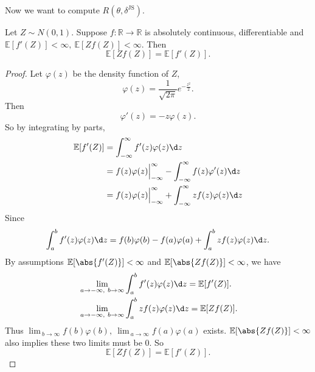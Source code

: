 \documentclass[a4paper]{article}
\begin{document}
\noindent Now we want to compute $R(\theta,\delta^{\text{JS}})$.

\begin{lemma}
	Let $Z \sim N(0,1)$. Suppose $f: \mathbb{R} \to \mathbb{R}$ is absolutely continuous, differentiable and $\mathbb{E}[f'(Z)] < \infty, \ \mathbb{E}[Zf(Z)] < \infty$. Then
	\begin{equation}
		\mathbb{E}[Zf(Z)] = \mathbb{E}[f'(Z)].
	\end{equation}
\end{lemma}

\begin{proof}
	Let $\varphi(z)$ be the density function of $Z$,
	\begin{equation*}
		\varphi(z) = \frac{1}{\sqrt{2\pi}}e^{-\frac{z^2}{2}}.
	\end{equation*}
	Then
	\begin{equation*}
		\varphi'(z) = -z\varphi(z).
	\end{equation*}
	So by integrating by parts,
	\begin{equation*}
		\begin{aligned}
			\mathbb{E}[f'(Z)] &= \int_{-\infty}^{\infty} f'(z)\varphi(z)\d z \\
			&= f(z)\varphi(z)\Big|_{-\infty}^{\infty} - \int_{-\infty}^{\infty} f(z) \varphi'(z)\d z \\
			&= f(z)\varphi(z)\Big|_{-\infty}^{\infty} + \int_{-\infty}^{\infty} zf(z) \varphi(z)\d z
		\end{aligned}
	\end{equation*}
	Since
	\begin{equation*}
		\int_{a}^{b} f'(z)\varphi(z)\d z = f(b)\varphi(b) - f(a)\varphi(a) + \int_{a}^{b} zf(z) \varphi(z)\d z.
	\end{equation*}
	By assumptions $\mathbb{E}[\abs{f'(Z)}] < \infty$ and $\mathbb{E}[\abs{Zf(Z)}] < \infty$, we have
	\begin{equation*}
		\begin{aligned}
			& \lim_{a \to -\infty, \ b \to \infty} \int_a^b f'(z)\varphi(z)\d z = \mathbb{E}[f'(Z)]. \\
			& \lim_{a \to -\infty, \ b \to \infty} \int_a^b zf(z)\varphi(z)\d z = \mathbb{E}[Zf(Z)].
		\end{aligned}
	\end{equation*}
	Thus $\lim_{\ b \to \infty}f(b)\varphi(b), \ \lim_{\ a \to \infty}f(a)\varphi(a)$ exists. $\mathbb{E}[\abs{Zf(Z)}] < \infty$ also implies these two limits must be $0$. So
	\begin{equation}
		\mathbb{E}[Zf(Z)] = \mathbb{E}[f'(Z)].
	\end{equation}
\end{proof}
\end{document}
